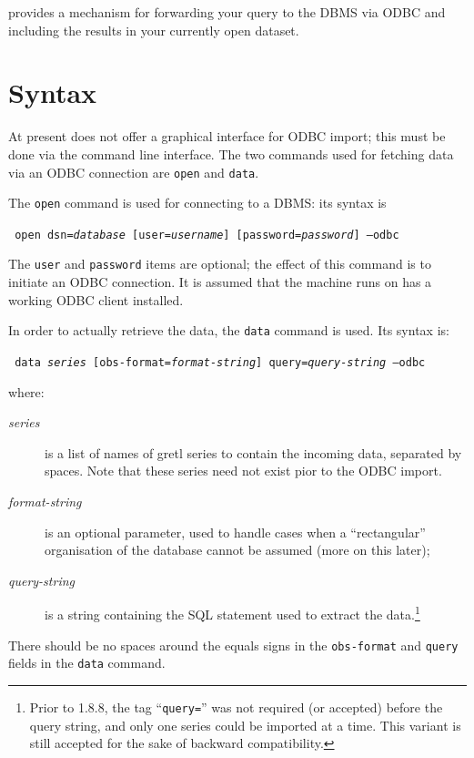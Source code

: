  provides a mechanism for forwarding your query to the DBMS
via ODBC and including the results in your currently open dataset.

\section{Syntax}
\label{sec:odbc-syntax}

At present  does not offer a graphical interface for ODBC
import; this must be done via the command line interface. The two
commands used for fetching data via an ODBC connection are
\texttt{open} and \texttt{data}.

The \texttt{open} command is used for connecting to a DBMS: its syntax
is
\begin{flushleft}
\texttt{%
  open dsn=\emph{database} [user=\emph{username}]
  [password=\emph{password}] --odbc
}
\end{flushleft}
The \texttt{user} and \texttt{password} items are optional; the effect
of this command is to initiate an ODBC connection. It is assumed that
the machine  runs on has a working ODBC client installed.

In order to actually retrieve the data, the \texttt{data} command is
used. Its syntax is:
\begin{flushleft}
\texttt{%
  data \emph{series} [obs-format=\emph{format-string}] query=\emph{query-string} --odbc
}
\end{flushleft}
where:
\begin{description}
\item[\emph{series}] is a list of names of gretl series to contain the
  incoming data, separated by spaces.  Note that these series need not
  exist pior to the ODBC import.
\item[\emph{format-string}] is an optional parameter, used to handle
  cases when a ``rectangular'' organisation of the database cannot be
  assumed (more on this later);
\item[\emph{query-string}] is a string containing the SQL statement
  used to extract the data.\footnote{Prior to  1.8.8, the
    tag ``\texttt{query=}'' was not required (or accepted) before the query
    string, and only one series could be imported at a time.  This
    variant is still accepted for the sake of backward compatibility.}
\end{description}
%
There should be no spaces around the equals signs in the
\texttt{obs-format} and \texttt{query} fields in the \texttt{data}
command.


